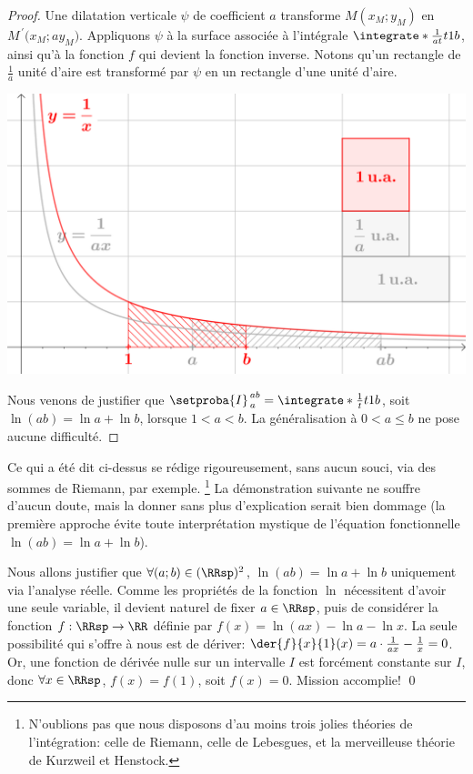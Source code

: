 \begin{proof}
	Une dilatation verticale $\psi$ de coefficient $a$ transforme $M(x_M ; y_M)$ en $M^{\,\prime}\big( x_M ; a y_M)$. 
	Appliquons $\psi$ à la surface associée à l'intégrale $\integrate*{\frac{1}{at}}{t}{1}{b}$, ainsi qu'à la fonction $f$ qui devient la fonction inverse. Notons qu'un rectangle de $\frac1a$ unité d'aire est transformé par $\psi$ en un rectangle d'une unité d'aire.

	\begin{center}
		\includegraphics[scale=.5]{content/ln/func-eq-3.png}
	\end{center}
	
	Nous venons de justifier que 
	$\setproba{I}_{\,a}^{\,ab} = \integrate*{\frac{1}{t}}{t}{1}{b}$,
	soit
	$\ln(a b) = \ln a + \ln b$,
	lorsque $1 < a < b$.
	La généralisation à $0 < a \leq b$ ne pose aucune difficulté.
\end{proof}


\begin{remark}
	Ce qui a été dit ci-dessus se rédige rigoureusement, sans aucun souci, via des sommes de Riemann, par exemple.%
	\footnote{
		N'oublions pas que nous disposons d'au moins trois jolies théories de l'intégration:
    	celle de Riemann,
    	celle de Lebesgues,
    	et
    	la merveilleuse théorie de Kurzweil et Henstock.
	}
	La démonstration suivante ne souffre d'aucun doute, mais la donner sans plus d'explication serait bien dommage (la première approche évite toute interprétation mystique de l'équation fonctionnelle $\ln(a b) = \ln a + \ln b$). 
\end{remark}


{
\emph{\altproof{}}
	Nous allons justifier que 
	$\forall (a;b) \in ( \RRsp )^2$,
	$\ln(a b) = \ln a + \ln b$
	uniquement via l'analyse réelle.
	Comme les propriétés de la fonction $\ln$ nécessitent d'avoir une seule variable,
	il devient naturel de fixer $a \in \RRsp$, puis de considérer la fonction
	$f: \RRsp \to \RR$
	définie par
	$f(x) = \ln(a x) - \ln a - \ln x$.
	La seule possibilité qui s'offre à nous est de dériver:
	$\der{f}{x}{1}(x) = a \cdot \frac{1}{a x} - \frac1x = 0$.
	Or,
	une fonction de dérivée nulle sur un intervalle $I$ est forcément constante sur $I$,
	donc
	$\forall x \in \RRsp$,
	$f(x) = f(1)$,
	soit
	$f(x) = 0$.
	Mission accomplie!
\qed
}


